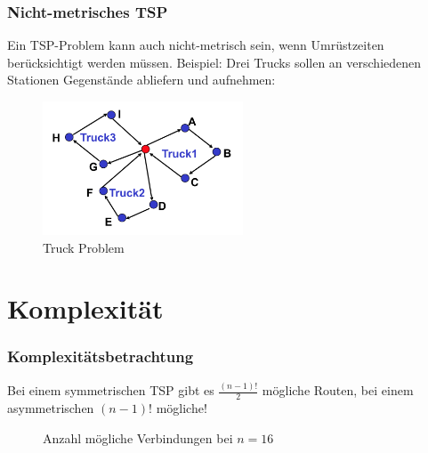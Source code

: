 \documentclass{beamer}
\begin{document}
  \begin{frame}
    \frametitle{Nicht-metrisches TSP}
    Ein TSP-Problem kann auch nicht-metrisch sein, wenn Umrüstzeiten
    berücksichtigt werden müssen.
    \pause
    \linebreak
    Beispiel: Drei Trucks sollen an verschiedenen Stationen Gegenstände
    abliefern und aufnehmen:
    \begin{figure}
      \centering
      \includegraphics[width=\linewidth,height=150px,keepaspectratio]{truck_problem.png}
      \caption{Truck Problem}
    \end{figure}
  \end{frame}

  \section{Komplexität}
  \begin{frame}
    \frametitle{Komplexitätsbetrachtung}
    Bei einem symmetrischen TSP gibt es $\frac{(n-1)!}{2}$ mögliche Routen,
    bei einem asymmetrischen $(n-1)!$ mögliche!

    \newcount\mycount

    \begin{figure}
      \centering
      \caption{Anzahl mögliche Verbindungen bei $n=16$}
    \end{figure}
  \end{frame}
\end{document}
